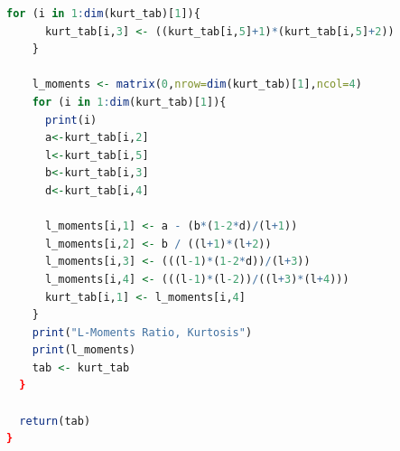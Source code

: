 \documentclass[12pt]{article}
\begin{document}
\begin{lstlisting}[language=R]
    for (i in 1:dim(kurt_tab)[1]){
      kurt_tab[i,3] <- ((kurt_tab[i,5]+1)*(kurt_tab[i,5]+2))
    }
    
    l_moments <- matrix(0,nrow=dim(kurt_tab)[1],ncol=4)
    for (i in 1:dim(kurt_tab)[1]){
      print(i)
      a<-kurt_tab[i,2]
      l<-kurt_tab[i,5]
      b<-kurt_tab[i,3]
      d<-kurt_tab[i,4]
      
      l_moments[i,1] <- a - (b*(1-2*d)/(l+1))
      l_moments[i,2] <- b / ((l+1)*(l+2))
      l_moments[i,3] <- (((l-1)*(1-2*d))/(l+3))
      l_moments[i,4] <- (((l-1)*(l-2))/((l+3)*(l+4)))
      kurt_tab[i,1] <- l_moments[i,4]
    }
    print("L-Moments Ratio, Kurtosis")
    print(l_moments)
    tab <- kurt_tab
  }
  
  return(tab)
}
\end{lstlisting}
\end{document}
